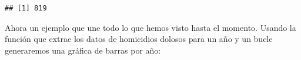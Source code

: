 \documentclass[]{book}
\newenvironment{Shaded}{\begin{snugshade}}{\end{snugshade}}
\newcommand{\KeywordTok}[1]{\textcolor[rgb]{0.13,0.29,0.53}{\textbf{#1}}}
\newcommand{\DataTypeTok}[1]{\textcolor[rgb]{0.13,0.29,0.53}{#1}}
\newcommand{\DecValTok}[1]{\textcolor[rgb]{0.00,0.00,0.81}{#1}}
\newcommand{\StringTok}[1]{\textcolor[rgb]{0.31,0.60,0.02}{#1}}
\newcommand{\ControlFlowTok}[1]{\textcolor[rgb]{0.13,0.29,0.53}{\textbf{#1}}}
\newcommand{\OperatorTok}[1]{\textcolor[rgb]{0.81,0.36,0.00}{\textbf{#1}}}
\newcommand{\NormalTok}[1]{#1}
\theoremstyle{definition}
\theoremstyle{definition}
\theoremstyle{definition}
\theoremstyle{remark}
\begin{document}
\begin{Shaded}
\end{Shaded}

\begin{verbatim}
## [1] 819
\end{verbatim}

Ahora un ejemplo que une todo lo que hemos visto hasta el momento.
Usando la función que extrae los datos de homicidios dolosos para un año
y un bucle generaremos una gráfica de barras por año:
\end{document}
